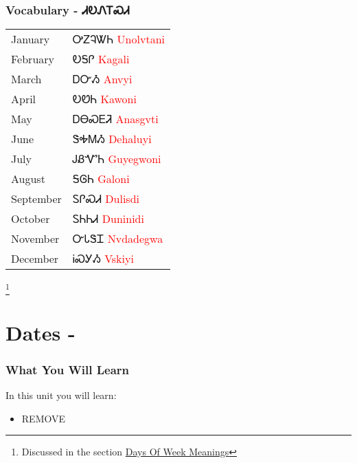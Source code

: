 {{{{\subsection{Vocabulary - ᏗᎧᏁᎢᏍᏗ 
}
\begin{tabular}{p{3cm} p{11cm}}
January & ᎤᏃᎸᏔᏂ 
 \newline \textcolor{red}{Unolvtani}\\
February & ᎧᎦᎵ 
 \newline \textcolor{red}{Kagali}\\
March & ᎠᏅᏱ 
 \newline \textcolor{red}{Anvyi}\\
April & ᎧᏬᏂ 
 \newline \textcolor{red}{Kawoni}\\
May & ᎠᎾᏍᎬᏘ 
 \newline \textcolor{red}{Anasgvti}\\
June & ᏕᎭᎷᏱ 
 \newline \textcolor{red}{Dehaluyi}\\
July & ᎫᏰᏉᏂ 
 \newline \textcolor{red}{Guyegwoni}\\
August & ᎦᎶᏂ 
 \newline \textcolor{red}{Galoni}\\
September & ᏚᎵᏍᏗ 
 \newline \textcolor{red}{Dulisdi}\\
October & ᏚᏂᏂᏗ 
 \newline \textcolor{red}{Duninidi}\\
November & ᏅᏓᏕᏆ 
 \newline \textcolor{red}{Nvdadegwa}\\
December & ᎥᏍᎩᏱ 
 \newline \textcolor{red}{Vskiyi}\\
\end{tabular}

\footnote{Discussed in the section \hyperref[sec:daysOfWeekMeaning]{Days Of Week Meanings}}
\index{}
\chapter{Dates - }
\subsection{What You Will Learn}
In this unit you will learn:
\begin{itemize}
\item REMOVE
\end{itemize}\newpage

}}}}
